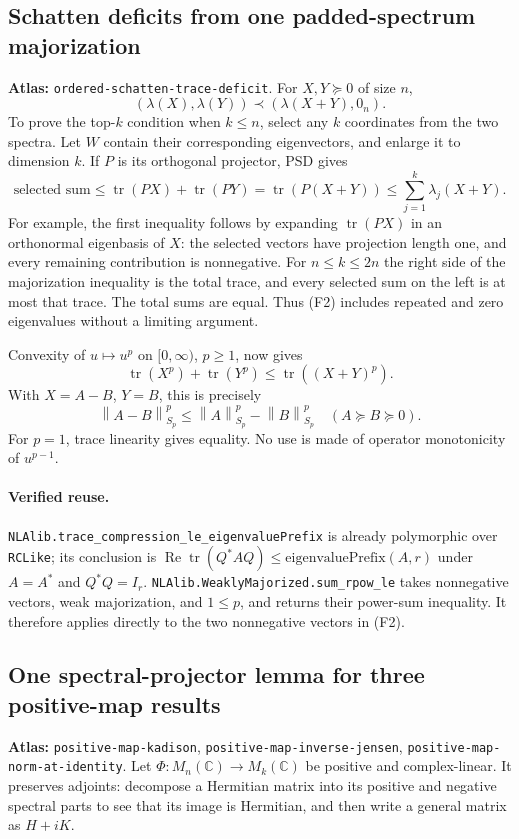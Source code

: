 \documentclass[11pt,a4paper]{article}
\newcommand{\C}{\mathbb C}
\newcommand{\norm}[1]{\left\lVert#1\right\rVert}
\DeclareMathOperator{\tr}{tr}
\DeclareRobustCommand{\code}[1]{{\footnotesize\urlstyle{tt}\nolinkurl{#1}}}
\begin{document}
\subsection{Schatten deficits from one padded-spectrum majorization}
\label{sec:ordered-schatten-trace-deficit}
\textbf{Atlas:} \code{ordered-schatten-trace-deficit}.
For $X,Y\succeq0$ of size $n$,
\[
 (\lambda(X),\lambda(Y))\prec(\lambda(X+Y),0_n).                 \tag{F2}
\]
To prove the top-$k$ condition when $k\le n$, select any $k$ coordinates
from the two spectra. Let $W$ contain their corresponding eigenvectors,
and enlarge it to dimension $k$. If $P$ is its orthogonal projector, PSD
gives
\[
 \text{selected sum}\le\tr(PX)+\tr(PY)
 =\tr(P(X+Y))\le\sum_{j=1}^k\lambda_j(X+Y).
\]
For example, the first inequality follows by expanding $\tr(PX)$ in an
orthonormal eigenbasis of $X$: the selected vectors have projection length
one, and every remaining contribution is nonnegative. For $n\le k\le2n$
the right side of the majorization inequality is the total trace, and every
selected sum on the left is at most that trace. The total sums are equal.
Thus (F2) includes repeated and zero eigenvalues without a limiting argument.

Convexity of $u\mapsto u^p$ on $[0,\infty)$, $p\ge1$, now gives
\[
 \tr(X^p)+\tr(Y^p)\le\tr((X+Y)^p).
\]
With $X=A-B$, $Y=B$, this is precisely
\[
 \norm{A-B}_{S_p}^{p}\le\norm A_{S_p}^{p}-\norm B_{S_p}^{p}
 \quad(A\succeq B\succeq0).
\]
For $p=1$, trace linearity gives equality. No use is made of operator
monotonicity of $u^{p-1}$.

\paragraph{Verified reuse.}
\code{NLAlib.trace_compression_le_eigenvaluePrefix} is already polymorphic
over \code{RCLike}; its conclusion is
$\operatorname{Re}\tr(Q^*AQ)\le\mathrm{eigenvaluePrefix}(A,r)$ under
$A=A^*$ and $Q^*Q=I_r$.
\code{NLAlib.WeaklyMajorized.sum_rpow_le} takes nonnegative vectors,
weak majorization, and $1\le p$, and returns their power-sum inequality.
It therefore applies directly to the two nonnegative vectors in (F2).

\subsection{One spectral-projector lemma for three positive-map results}
\label{sec:positive-map-kadison}
\textbf{Atlas:} \code{positive-map-kadison},
\code{positive-map-inverse-jensen}, \code{positive-map-norm-at-identity}.
Let $\Phi:M_n(\C)\to M_k(\C)$ be positive and complex-linear. It preserves
adjoints: decompose a Hermitian matrix into its positive and negative spectral
parts to see that its image is Hermitian, and then write a general matrix as
$H+iK$.
\end{document}

